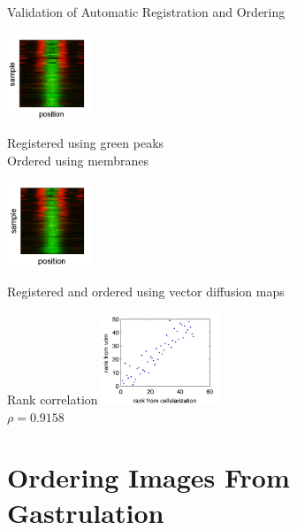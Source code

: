 \documentclass[10pt,aspectratio=169]{beamer}
\begin{document}
\begin{frame}{Validation of Automatic Registration and Ordering}
\begin{minipage}{3.1in}
\begin{minipage}{1.3in}
\centering
\includegraphics[width=1in]{fig6b}\\
{\scriptsize Registered using green peaks \\
Ordered using membranes \par}
\end{minipage}
%
\begin{minipage}{1.3in}
\centering
\includegraphics[width=1in]{fig6c}\\
{\scriptsize Registered and ordered using vector diffusion maps \par}
\end{minipage}
\end{minipage}
\hspace{0.5in}
\begin{minipage}{1.5in}
\centering
Rank correlation
\includegraphics[width=1.4in]{rank_corr_vdm}\\
$\rho=0.9158$
\end{minipage}

\end{frame}

\section{Ordering Images From Gastrulation}
\end{document}
